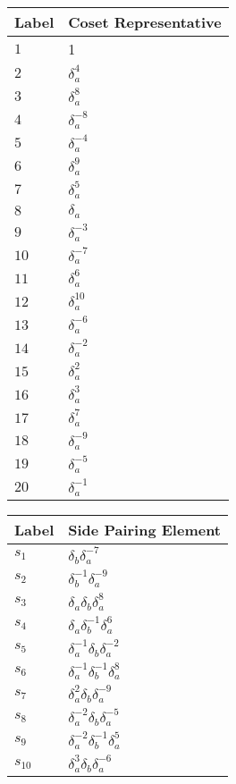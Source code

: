 \documentclass{article}
\begin{document}

\begin{center}
\begin{tabular}{ll}
\toprule
Label & Coset Representative\\
\midrule
$1$ & 1 \\
$2$ & $\delta_a^{4}$ \\
$3$ & $\delta_a^{8}$ \\
$4$ & $\delta_a^{-8}$ \\
$5$ & $\delta_a^{-4}$ \\
$6$ & $\delta_a^{9}$ \\
$7$ & $\delta_a^{5}$ \\
$8$ & $\delta_a^{}$ \\
$9$ & $\delta_a^{-3}$ \\
$10$ & $\delta_a^{-7}$ \\
$11$ & $\delta_a^{6}$ \\
$12$ & $\delta_a^{10}$ \\
$13$ & $\delta_a^{-6}$ \\
$14$ & $\delta_a^{-2}$ \\
$15$ & $\delta_a^{2}$ \\
$16$ & $\delta_a^{3}$ \\
$17$ & $\delta_a^{7}$ \\
$18$ & $\delta_a^{-9}$ \\
$19$ & $\delta_a^{-5}$ \\
$20$ & $\delta_a^{-1}$ \\
\bottomrule
\end{tabular}
\hfill
\begin{tabular}{ll}
\toprule
Label & Side Pairing Element\\
\midrule
$s_{1}$ & $\delta_b^{}\delta_a^{-7}$ \\
$s_{2}$ & $\delta_b^{-1}\delta_a^{-9}$ \\
$s_{3}$ & $\delta_a^{}\delta_b^{}\delta_a^{8}$ \\
$s_{4}$ & $\delta_a^{}\delta_b^{-1}\delta_a^{6}$ \\
$s_{5}$ & $\delta_a^{-1}\delta_b^{}\delta_a^{-2}$ \\
$s_{6}$ & $\delta_a^{-1}\delta_b^{-1}\delta_a^{8}$ \\
$s_{7}$ & $\delta_a^{2}\delta_b^{}\delta_a^{-9}$ \\
$s_{8}$ & $\delta_a^{-2}\delta_b^{}\delta_a^{-5}$ \\
$s_{9}$ & $\delta_a^{-2}\delta_b^{-1}\delta_a^{5}$ \\
$s_{10}$ & $\delta_a^{3}\delta_b^{}\delta_a^{-6}$ \\

\end{tabular}
\end{center}
\end{document}
